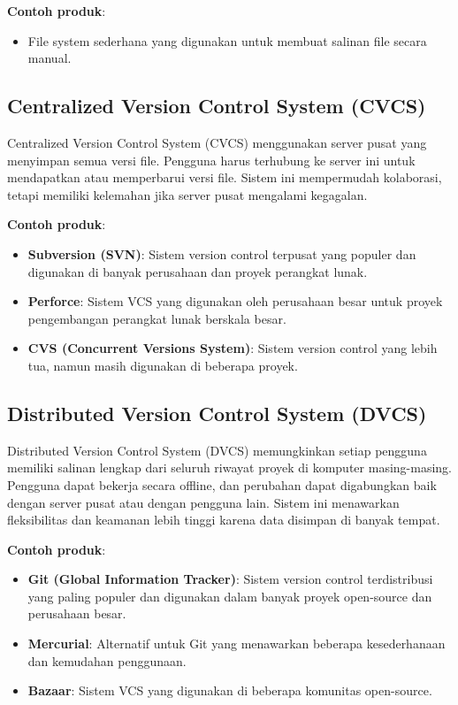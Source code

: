 \textbf{Contoh produk}:
\begin{itemize}
	\item File system sederhana yang digunakan untuk membuat salinan file secara manual.
\end{itemize}

\subsection{Centralized Version Control System (CVCS)}
Centralized Version Control System (CVCS) menggunakan server pusat yang menyimpan semua versi file. Pengguna harus terhubung ke server ini untuk mendapatkan atau memperbarui versi file. Sistem ini mempermudah kolaborasi, tetapi memiliki kelemahan jika server pusat mengalami kegagalan.

\textbf{Contoh produk}:
\begin{itemize}
	\item \textbf{Subversion (SVN)}: Sistem version control terpusat yang populer dan digunakan di banyak perusahaan dan proyek perangkat lunak.
	\item \textbf{Perforce}: Sistem VCS yang digunakan oleh perusahaan besar untuk proyek pengembangan perangkat lunak berskala besar.
	\item \textbf{CVS (Concurrent Versions System)}: Sistem version control yang lebih tua, namun masih digunakan di beberapa proyek.
\end{itemize}

\subsection{Distributed Version Control System (DVCS)}
Distributed Version Control System (DVCS) memungkinkan setiap pengguna memiliki salinan lengkap dari seluruh riwayat proyek di komputer masing-masing. Pengguna dapat bekerja secara offline, dan perubahan dapat digabungkan baik dengan server pusat atau dengan pengguna lain. Sistem ini menawarkan fleksibilitas dan keamanan lebih tinggi karena data disimpan di banyak tempat.

\textbf{Contoh produk}:
\begin{itemize}
	\item \textbf{Git (Global Information Tracker)}: Sistem version control terdistribusi yang paling populer dan digunakan dalam banyak proyek open-source dan perusahaan besar.
	\item \textbf{Mercurial}: Alternatif untuk Git yang menawarkan beberapa kesederhanaan dan kemudahan penggunaan.
	\item \textbf{Bazaar}: Sistem VCS yang digunakan di beberapa komunitas open-source.
\end{itemize}

